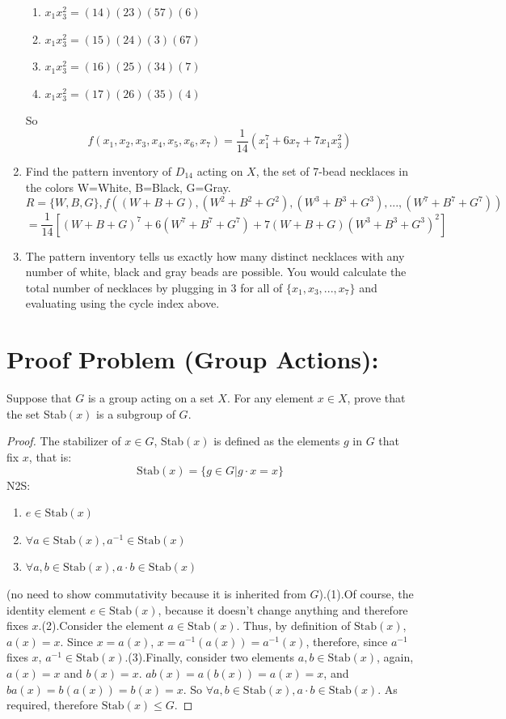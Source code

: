 \documentclass[12pt]{article}
\begin{document}
\begin{enumerate}[label=(\alph*)]
\begin{enumerate}[label=(\roman*)]
    \item $x_1x_3^2=(14)(23)(57)(6)$
    \item $x_1x_3^2=(15)(24)(3)(67)$
    \item $x_1x_3^2=(16)(25)(34)(7)$
    \item $x_1x_3^2=(17)(26)(35)(4)$
\end{enumerate}
So $$f(x_1,x_2,x_3,x_4,x_5,x_6,x_7)=\frac{1}{14}(x_1^7+6x_7+7x_1x_3^2)$$
    \item Find the pattern inventory of $D_{14}$ acting on $X$, the set of 7-bead necklaces in the colors W=White, B=Black, G=Gray. $$R=\{W,B,G\},f((W+B+G),(W^2+B^2+G^2),(W^3+B^3+G^3),...,(W^7+B^7+G^7))$$ $$=\frac{1}{14}[(W+B+G)^7+6(W^7+B^7+G^7)+7(W+B+G)(W^3+B^3+G^3)^2]$$
    \item The pattern inventory tells us exactly how many distinct necklaces with any number of white, black and gray beads are possible. You would calculate the total number of necklaces by plugging in 3 for all of $\{x_1,x_3,...,x_7\}$ and evaluating using the cycle index above.
\end{enumerate}
\section{Proof Problem (Group Actions):}
Suppose that $G$ is a group acting on a set $X$. For any element $x\in X$, prove that the set Stab$(x)$ is a subgroup of $G$.
\begin{proof}
The stabilizer of $x\in G$, Stab$(x)$ is defined as the elements $g$ in $G$ that fix $x$, that is:$$\text{Stab}(x)=\{g\in G|g\cdot x=x\}$$ N2S: \begin{enumerate}
    \item $e\in\text{Stab}(x)$
    \item $\forall a\in\text{Stab}(x),a^{-1}\in\text{Stab}(x)$
    \item $\forall a,b\in\text{Stab}(x),a\cdot b\in\text{Stab}(x)$
\end{enumerate}(no need to show commutativity because it is inherited from $G$).\newline (1).\newline Of course, the identity element $e\in\text{Stab}(x)$, because it doesn't change anything and therefore fixes $x$.\newline(2).\newline Consider the element $a\in\text{Stab}(x)$. Thus, by definition of $\text{Stab}(x)$, $a(x)=x$. Since $x=a(x)$, $x=a^{-1}(a(x))=a^{-1}(x)$, therefore, since $a^{-1}$ fixes $x$, $a^{-1}\in\text{Stab}(x)$.\newline(3).\newline Finally, consider two elements $a,b\in\text{Stab}(x)$, again, $a(x)=x$ and $b(x)=x$. $ab(x)=a(b(x))=a(x)=x$, and $ba(x)=b(a(x))=b(x)=x$. So $\forall a,b\in\text{Stab}(x),a\cdot b\in\text{Stab}(x)$. As required, therefore $\text{Stab}(x)\leq G$.
\end{proof}
\end{document}
